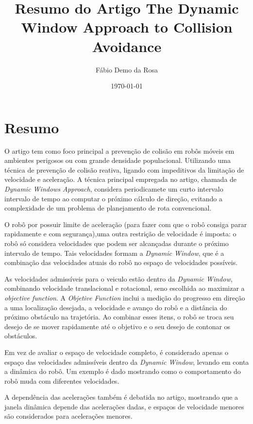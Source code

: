 \documentclass[12pt, a4paper]{article}
\begin{document}
\title{Resumo do Artigo The Dynamic Window Approach to Collision Avoidance}
\author{Fábio Demo da Rosa}
\date{\today}

\maketitle

\section{Resumo}
	O artigo tem como foco principal a prevenção de colisão em robôs móveis em ambientes perigosos ou com grande densidade populacional. Utilizando uma técnica de prevenção de colisão reativa, ligando com impeditivos da limitação de velocidade e aceleração.
	A técnica principal empregada no artigo, chamada de \textit{Dynamic Windows Approach}, considera periodicamete um curto intervalo intervalo de tempo ao computar o próximo cálculo de direção, evitando a complexidade de um problema de planejamento de rota convencional.

	O robô por possuir limite de aceleração (para fazer com que o robô consiga parar rapidamente e com segurança),uma outra restrição de velocidade é imposta: o robô só considera velocidades que podem ser alcançadas durante o próximo intervalo de tempo. 
	Tais velocidades formam a \textit{Dynamic Window}, que é a combinação das velocidades atuais do robô no espaço de velocidades possíveis.

	As velocidades admissíveis para o veiculo estão dentro da \textit{Dynamic Window}, combinando velocidade translacional e rotacional, seno escolhida ao maximizar a \textit{objective function}. A \textit{Objetive Function} inclui a medição do progresso em direção a uma localização desejada, a velocidade e avanço do robô e a distância do próximo obstáculo na trajetória.
	Ao combinar esses itens, o robô se troca seu desejo de se mover rapidamente até o objetivo e o seu desejo de contonar os obstáculos.

	Em vez de avaliar o espaço de velocidade completo, é considerado apenas o espaço das velocidades admissíveis dentro da \textit{Dynamic Window}, levando em conta a dinâmica do robô. Um exemplo é dado mostrando como o comportamento do robô muda com diferentes velocidades.

	A dependência das acelerações também é debatida no artigo, mostrando que a janela dinâmica depende das acelerações dadas, e espaços de velocidade menores são considerados para acelerações menores.
\end{document}
